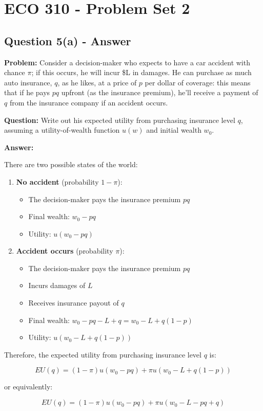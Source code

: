 \documentclass[12pt]{article}
\begin{document}
\section*{ECO 310 - Problem Set 2}
\subsection*{Question 5(a) - Answer}

\textbf{Problem:} Consider a decision-maker who expects to have a car accident with chance $\pi$; if this occurs, he will incur \$L in damages. He can purchase as much auto insurance, $q$, as he likes, at a price of $p$ per dollar of coverage: this means that if he pays $pq$ upfront (as the insurance premium), he'll receive a payment of $q$ from the insurance company if an accident occurs.

\vspace{0.3cm}

\textbf{Question:} Write out his expected utility from purchasing insurance level $q$, assuming a utility-of-wealth function $u(w)$ and initial wealth $w_0$.

\vspace{0.5cm}

\textbf{Answer:}

There are two possible states of the world:

\begin{enumerate}
    \item \textbf{No accident} (probability $1-\pi$):
    \begin{itemize}
        \item The decision-maker pays the insurance premium $pq$
        \item Final wealth: $w_0 - pq$
        \item Utility: $u(w_0 - pq)$
    \end{itemize}

    \item \textbf{Accident occurs} (probability $\pi$):
    \begin{itemize}
        \item The decision-maker pays the insurance premium $pq$
        \item Incurs damages of $L$
        \item Receives insurance payout of $q$
        \item Final wealth: $w_0 - pq - L + q = w_0 - L + q(1-p)$
        \item Utility: $u(w_0 - L + q(1-p))$
    \end{itemize}
\end{enumerate}

\vspace{0.3cm}

Therefore, the expected utility from purchasing insurance level $q$ is:

\begin{equation}
\boxed{EU(q) = (1-\pi)u(w_0 - pq) + \pi u(w_0 - L + q(1-p))}
\end{equation}

or equivalently:

\begin{equation}
\boxed{EU(q) = (1-\pi)u(w_0 - pq) + \pi u(w_0 - L - pq + q)}
\end{equation}
\end{document}
